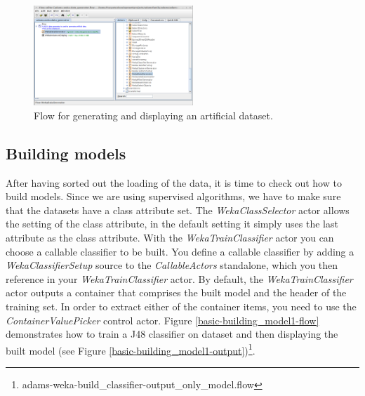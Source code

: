 \begin{figure}[htb]
  \centering
  \includegraphics[width=6.0cm]{images/basic-datagenerator.png}
  \caption{Flow for generating and displaying an artificial dataset.}
  \label{basic-datagenerator}
\end{figure}

\subsection{Building models}
After having sorted out the loading of the data, it is time to check out how to
build models. Since we are using supervised algorithms, we have to make sure
that the datasets have a class attribute set. The \textit{WekaClassSelector}
actor allows the setting of the class attribute, in the default setting it
simply uses the last attribute as the class attribute. With the
\textit{WekaTrainClassifier} actor you can choose a callable classifier to be built. 
You define a callable classifier by adding a \textit{WekaClassifierSetup} source
to the \textit{CallableActors} standalone, which you then reference in your 
\textit{WekaTrainClassifier} actor.
By default, the \textit{WekaTrainClassifier} actor outputs a container that comprises
the built model and the header of the training set. In order to extract either
of the container items, you need to use the \textit{ContainerValuePicker}
control actor. Figure \ref{basic-building_model1-flow} demonstrates how to train
a J48 classifier on dataset and then displaying the built model (see Figure
\ref{basic-building_model1-output})\footnote{adams-weka-build\_classifier-output\_only\_model.flow}.

